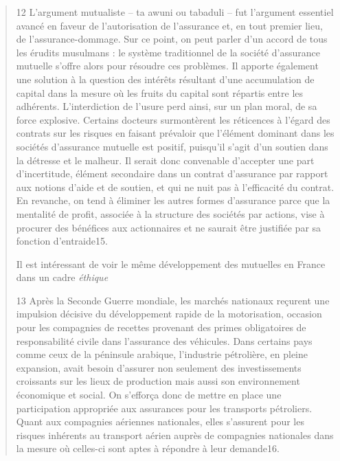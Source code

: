 \begin{quote}
    


12 L’argument mutualiste – ta awuni ou tabaduli – fut l’argument essentiel avancé en faveur de l’autorisation de l’assurance et, en tout premier lieu, de l’assurance-dommage. Sur ce point, on peut parler d’un accord de tous les érudits musulmans : le système traditionnel de la société d’assurance mutuelle s’offre alors pour résoudre ces problèmes. Il apporte également une solution à la question des intérêts résultant d’une accumulation de capital dans la mesure où les fruits du capital sont répartis entre les adhérents. L’interdiction de l’usure perd ainsi, sur un plan moral, de sa force explosive. Certains docteurs surmontèrent les réticences à l’égard des contrats sur les risques en faisant prévaloir que l’élément dominant dans les sociétés d’assurance mutuelle est positif, puisqu’il s’agit d’un soutien dans la détresse et le malheur. Il serait donc convenable d’accepter une part d’incertitude, élément secondaire dans un contrat d’assurance par rapport aux notions d’aide et de soutien, et qui ne nuit pas à l’efficacité du contrat. En revanche, on tend à éliminer les autres formes d’assurance parce que la mentalité de profit, associée à la structure des sociétés par actions, vise à procurer des bénéfices aux actionnaires et ne saurait être justifiée par sa fonction d’entraide15.
 
 \begin{Synthesis}
 Il est intéressant de voir le même développement des mutuelles en France dans un cadre \textit{éthique}
 \end{Synthesis}
13 Après la Seconde Guerre mondiale, les marchés nationaux reçurent une impulsion décisive du développement rapide de la motorisation, occasion pour les compagnies de recettes provenant des primes obligatoires de responsabilité civile dans l’assurance des véhicules. Dans certains pays comme ceux de la péninsule arabique, l’industrie pétrolière, en pleine expansion, avait besoin d’assurer non seulement des investissements croissants sur les lieux de production mais aussi son environnement économique et social. On s’efforça donc de mettre en place une participation appropriée aux assurances pour les transports pétroliers. Quant aux compagnies aériennes nationales, elles s’assurent pour les risques inhérents au transport aérien auprès de compagnies nationales dans la mesure où celles-ci sont aptes à répondre à leur demande16.
 

\end{quote}
